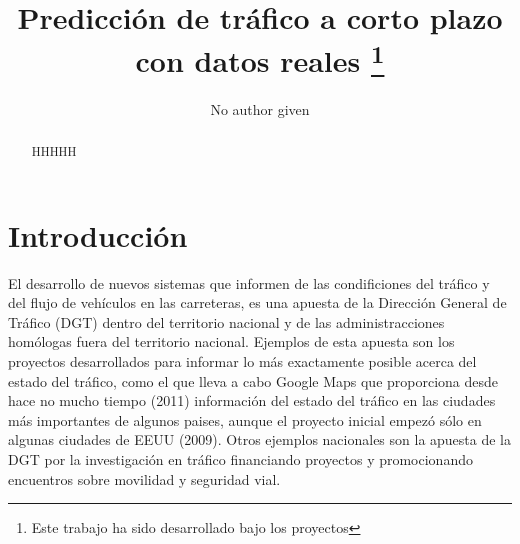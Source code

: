\documentclass[runningheads]{llncs}
\begin{document}
\mainmatter  %



\title{Predicci\'on de tr\'afico a corto plazo con datos reales \thanks{Este trabajo ha sido desarrollado bajo los proyectos 
}}

\author{No author given}

%







\maketitle
\begin{abstract}

HHHHH
\end{abstract}


\section{Introducci\'on}
\noindent 
El desarrollo de nuevos sistemas que informen de las condificiones del tráfico y del flujo de
veh\'iculos en las carreteras, es una apuesta de la Dirección General de Tráfico (DGT) dentro del
territorio nacional y de las administracciones homólogas fuera del territorio nacional. Ejemplos de
esta apuesta son los proyectos desarrollados para informar lo más exactamente posible
acerca del estado del tráfico, como el que lleva a cabo Google Maps que proporciona desde hace no
mucho tiempo (2011) información del estado del tráfico en las ciudades más importantes de algunos
paises, aunque el proyecto inicial empezó sólo en algunas ciudades de EEUU (2009). Otros ejemplos
nacionales son la apuesta de la DGT por la investigación en tráfico financiando proyectos y
promocionando encuentros sobre movilidad y seguridad vial.  
\end{document}
